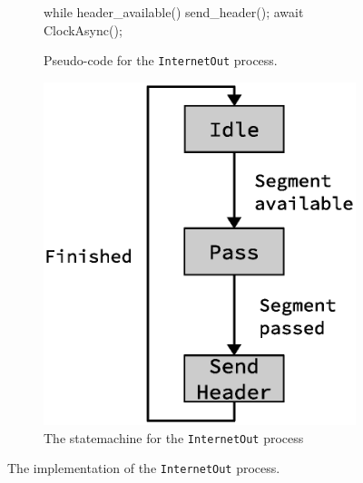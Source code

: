 \begin{figure}[htpb]
\begin{subfigure}[b]{0.45\textwidth}
\begin{mintedcsharp}
{{  while header_available() {
    send_header();
    await ClockAsync();
  }
}
}
\end{mintedcsharp}
        \caption{Pseudo-code for the \texttt{InternetOut} process.\\}
	\label{fig:internet_out_pseudocode}
    \end{subfigure}%
    \hfill
    \begin{subfigure}[b]{0.45\textwidth}
        \centering
        \includegraphics[scale=0.45]{implementation/internet_out_fsm.eps}
        \caption{The statemachine for the \texttt{InternetOut} process}
 	\label{fig:internet_out_fsm}
    \end{subfigure}%
    \caption{The implementation of the \texttt{InternetOut} process.}
    \label{fig:internet_out_implementation}
\end{figure}


